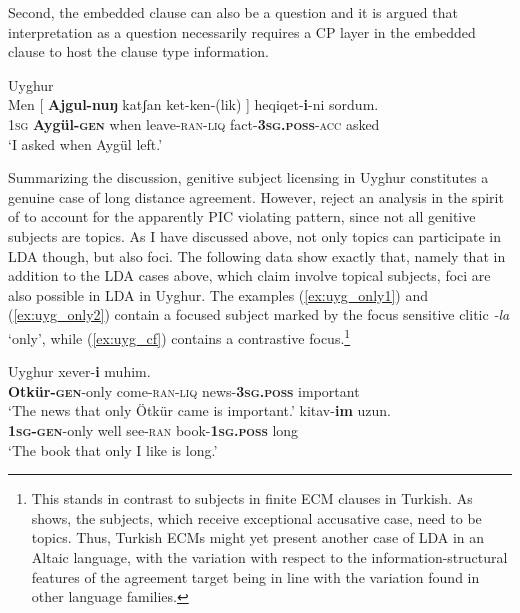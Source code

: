 \documentclass[output=paper
,modfonts
,nonflat]{langsci/langscibook}
\begin{document}
Second, the embedded clause can also be a question and it is argued that interpretation as a question necessarily requires a CP layer in the embedded clause to host the clause type information.
\begin{exe}
\ex Uyghur \citep[][8]{Asarina_Hartman2011a}\\
	\gll Men [ \textbf{Ajgul-nuŋ} katʃan ket-ken-(lik) ] heqiqet-\textbf{i}-ni sordum.\\
		 \textsc{1sg} {} \textbf{Aygül-\textsc{gen}} when leave-\textsc{ran}-\textsc{liq} {} fact-\textbf{\textsc{3sg.poss}}-\textsc{acc} asked\\
	\glt `I asked when Aygül left.'
\end{exe}
Summarizing the discussion, genitive subject licensing in Uyghur constitutes a genuine case of long distance agreement. However, \citet{Asarina_Hartman2011a} reject an analysis in the spirit of \citet{Polinsky_Potsdam2001} to account for the apparently PIC violating pattern, since not all genitive subjects are topics. As I have discussed above, not only topics can participate in LDA though, but also foci. The following data show exactly that, namely that in addition to the LDA cases above, which \citet{Asarina_Hartman2011a} claim involve topical subjects, foci are also possible in LDA in Uyghur. The examples (\ref{ex:uyg_only1}) and (\ref{ex:uyg_only2}) contain a focused subject marked by the focus sensitive clitic \textit{-la} `only', while (\ref{ex:uyg_cf}) contains a contrastive focus.\footnote{This stands in contrast to subjects in finite ECM clauses in Turkish. As \citet{Sener2008} shows, the subjects, which receive exceptional accusative case, need to be topics. Thus, Turkish ECMs might yet present another case of LDA in an Altaic language, with the variation with respect to the information-structural features of the agreement target being in line with the variation found in other language families.}
\begin{exe}
\ex Uyghur \citep[][10]{Asarina_Hartman2011a}
	\xlist
	\ex \label{ex:uyg_only1}
		 xever-\textbf{i} muhim.\\
			 {} \textbf{Otkür-\textsc{gen}}-only come-\textsc{ran}-\textsc{liq} {} news-\textbf{3\textsc{sg.poss}} important\\
		\glt `The news that only Ötkür came is important.'
	\ex \label{ex:uyg_only2}
		 kitav-\textbf{im} uzun.\\
			 {} \textbf{\textsc{1sg}-\textsc{gen}}-only well see-\textsc{ran} {} book-\textbf{1\textsc{sg.poss}} long\\
		\glt `The book that only I like is long.'
	\endxlist
\end{exe}
\end{document}
